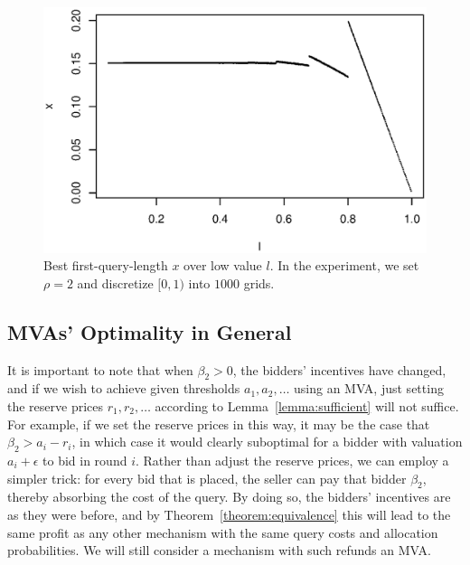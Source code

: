 \begin{figure}
    \includegraphics[trim=0mm 5mm 5mm 15mm, clip, width=\linewidth]{figures/10000-500-2-1-10}
    \caption{Best first-query-length $x$ over low value $l$. In the experiment, 
    we set $\rho=2$ and discretize $[0,1)$ into $1000$ grids.}
    \label{fig:x-l}
\end{figure}


\subsection{MVAs' Optimality in General}

It is important to note that when $\beta_2 > 0$, the bidders' incentives
have changed, and if we wish to achieve given  thresholds $a_1, a_2,
\ldots$ using an MVA, just setting the reserve prices $r_1, r_2, \ldots$
according to Lemma~\ref{lemma:sufficient} will not suffice.  For example,
if we set the reserve prices in this way,
it may be the case that $\beta_2 > a_i - r_i$, in which case it would clearly suboptimal for a bidder with valuation $a_i+\epsilon$ to bid in
round $i$.
Rather than
adjust the reserve prices, we can employ a simpler trick: for every bid
that is placed, the seller can pay that bidder $\beta_2$, thereby absorbing
the cost of the query.  By doing so, the bidders' incentives are as they
were before, 
and by
Theorem~\ref{theorem:equivalence} this will lead to the same profit as any
other mechanism with the same query costs and allocation probabilities.
We will still consider a mechanism with such refunds an MVA.



